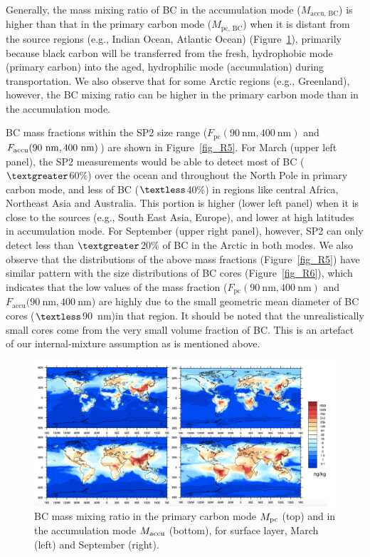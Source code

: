 \documentclass[12pt, fullpage]{uiucthesis2009}
\begin{document}
	
	Generally, the mass mixing ratio of BC in the accumulation mode ($M_{\text{accu, BC}}$) is higher than that in the primary carbon mode ($M_{\text{pc, BC}}$) when it is distant from the source regions (e.g., Indian Ocean, Atlantic Ocean) (Figure~\ref{fig_R4}), primarily because black carbon will be transferred from the fresh, hydrophobic mode (primary carbon) into the aged, hydrophilic mode (accumulation) during transportation. We also observe that for some Arctic regions (e.g., Greenland), however, the BC mixing ratio can be higher in the primary carbon mode than in the accumulation mode.
	
	BC mass fractions within the SP2 size range ($F_{\text{pc}}(90~\text{nm}, 400~\text{nm})$ and
	$F_{\text{accu}}(90~\rm nm, 400~\rm nm)$) are shown in Figure~\ref{fig_R5}. For March
	(upper left panel), the SP2 measurements would be able to detect most of BC ($\textgreater$60$\%$) over the ocean and throughout the North Pole in primary carbon mode, and less of BC ($\textless$40$\%$) in regions like central Africa, Northeast Asia and Australia. This portion is higher (lower left panel) when it is close to the sources (e.g., South East Asia, Europe), and lower at high latitudes in accumulation mode. For September
	(upper right panel), however, SP2 can only detect less than $\textgreater$20$\%$ of BC in the Arctic in both modes. We also observe that the distributions of the above mass fractions (Figure~\ref{fig_R5}) have similar pattern with the size distributions of BC cores (Figure~\ref{fig_R6}), which indicates that the low values of the mass fraction ($F_{\text{pc}}(90~\text{nm}, 400~\text{nm})$ and $F_{\text{accu}}(90~\text{nm}, 400~\text{nm}$) are highly due to the small geometric mean diameter of BC cores ($\textless$90~nm)in that region. It should be noted that the unrealistically small cores come from the very small volume fraction of BC. This is an artefact of our internal-mixture assumption as is mentioned above. 
	\begin{figure}[h] 
		\begin{center}
			\includegraphics[width = 1\textwidth]{Rplot01}
			\caption[BC mass mixing ratio in the primary carbon mode $M_{\rm pc}$ (top) and in the accumulation mode $M_{\rm accu}$ (bottom), for surface layer, March (left) and September (right).]{\label{fig_R4}BC mass mixing ratio in the primary carbon mode $M_{\rm pc}$ (top) and in the accumulation mode $M_{\rm accu}$ (bottom), for surface layer, March (left) and September (right).}
		\end{center}
	\end{figure}
	
\end{document}

